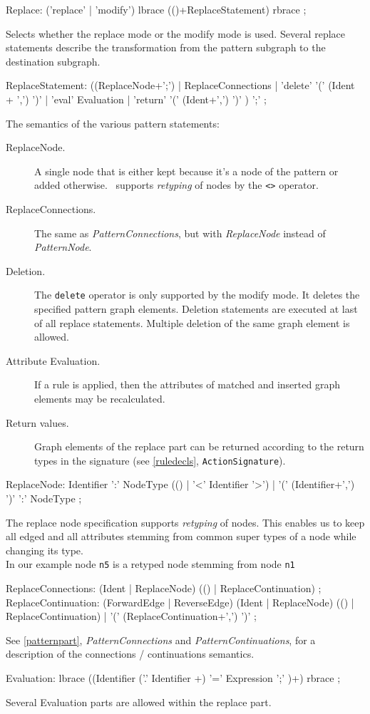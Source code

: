 \begin{rail}
  Replace: ('replace' | 'modify') lbrace (()+ReplaceStatement) rbrace ;
\end{rail}
Selects whether the replace mode or the modify mode is used. Several replace statements describe the transformation from the pattern subgraph to the destination subgraph.

\begin{rail}  
  ReplaceStatement: ((ReplaceNode+';') | 
    ReplaceConnections |
    'delete' '(' (Ident + ',') ')' |
    'eval' Evaluation |
    'return' '(' (Ident+',') ')' ) ';' ;
\end{rail}    
The semantics of the various pattern statements:
\begin{description}
  \item[ReplaceNode.] A single node that is either kept because it's a node of the pattern or added otherwise. \GrG\ supports \emph{retyping} of nodes by the \texttt{<>} operator.
  \item[ReplaceConnections.] The same as \emph{PatternConnections}, but with \emph{ReplaceNode} instead of \emph{PatternNode}.
  \item[Deletion.] The \texttt{delete} operator is only supported by the modify mode. It deletes the specified pattern graph elements. Deletion statements are executed at last of all replace statements. Multiple deletion of the same graph element is allowed.
  \item[Attribute Evaluation.] If a rule is applied, then the attributes of matched and inserted graph elements may be recalculated.
  \item[Return values.] Graph elements of the replace part can be returned according to the return types in the signature (see \ref{ruledecls}, \texttt{ActionSignature}).
\end{description}    
    
\begin{rail}    
    ReplaceNode: Identifier ':' NodeType (() | '<' Identifier '>') 
    | '(' (Identifier+',') ')' ':' NodeType ;
\end{rail}
The replace node specification supports \emph{retyping} of nodes. This enables us to keep all edged and all attributes stemming from common super types of a node while changing its type.\\ 
In our example node \texttt{n5} is a retyped node stemming from node \texttt{n1}

\begin{rail}
  ReplaceConnections: (Ident | ReplaceNode) (() | ReplaceContinuation) ;
  ReplaceContinuation:  (ForwardEdge | ReverseEdge) (Ident | ReplaceNode) (() | ReplaceContinuation) |
    '(' (ReplaceContinuation+',') ')' ;    
\end{rail}
See \ref{patternpart}, \emph{PatternConnections} and \emph{PatternContinuations}, for a description of the connections / continuations semantics.

\begin{rail}    
   Evaluation:  lbrace ((Identifier ('.' Identifier +) '=' Expression ';' )+) rbrace ;
\end{rail}
Several Evaluation parts are allowed within the replace part.